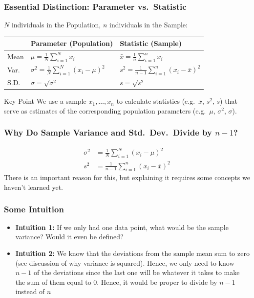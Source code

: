 \documentclass{beamer}
\begin{document}
\begin{frame}
\frametitle{Essential Distinction: Parameter vs.\ Statistic}
	$N$ individuals in the Population, $n$ individuals in the Sample:
	\bigskip
	\begin{tabular}{l|l|l}
		&\textbf{Parameter} (Population)&\textbf{Statistic} (Sample)\\
		\hline
		Mean & $\displaystyle \mu = \frac{1}{N} \sum_{i = 1}^N x_i$	& $\displaystyle \bar{x} = 				\frac{1}{n} \sum_{i = 1}^n x_i$ 
		\\
		Var.\ &$ \displaystyle \sigma^2 = \frac{1}{N}\sum_{i = 1}^N (x_i - \mu)^2$ &$ \displaystyle 			s^2 = \frac{1}{n - 1}\sum_{i = 1}^n(x_i - \bar{x})^2$
		\\
		S.D.\ & $ \displaystyle \sigma = \sqrt{\sigma^2}$ &$ \displaystyle s = \sqrt{s^2}$ 
	\end{tabular}
	\bigskip	
	\begin{alertblock}{Key Point}
		We  use a \alert{sample} $x_1, \hdots, x_n$ to calculate \alert{statistics} (e.g.\ $\bar{x}$, 				$s^2$, $s$) that serve as \alert{estimates} of the corresponding population 							\alert{parameters} (e.g.\ $\mu$, $\sigma^2$, $\sigma$).
	\end{alertblock}
\end{frame}

\begin{frame}
\frametitle{Why Do Sample Variance and Std.\ Dev.\ Divide by $n - 1$? }
	\begin{align*}
		\sigma^2 &= \frac{1}{N}\sum_{i = 1}^N (x_i - \mu)^2
		\\
		s^2 &= \frac{1}{n - 1}\sum_{i = 1}^n(x_i - \bar{x})^2
	\end{align*}
	\alert{There is an important reason for this, but explaining it requires some concepts we 				haven't learned yet. }
\end{frame}

\begin{frame}
\frametitle{Some Intuition}
	\begin{itemize}
		\item \textbf{Intuition 1:} If we only had one data point, what would be the sample 					variance? Would it even be defined?
		\item \textbf{Intuition 2:} We know that the deviations from the sample mean sum to zero 			(see discussion of why variance is squared). Hence, we only need to know $n - 1$ of the 				deviations since the last one will be whatever it takes to make the sum of them equal to 0. 			Hence, it would be proper to divide by $n - 1$ instead of $n$
	\end{itemize}
\end{frame}
\end{document}
